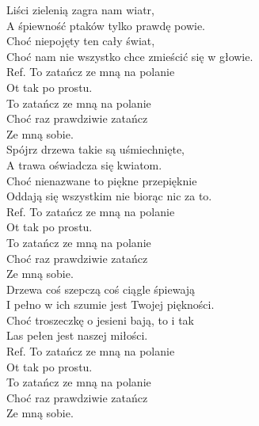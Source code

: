 
\begin{flushleft}
Liści zielenią zagra nam wiatr,  \tab{} \tab{} \\
A śpiewność ptaków tylko prawdę powie.  \tab{} \\
Choć niepojęty ten cały świat,  \tab{} \\
Choć nam nie wszystko chce zmieścić się w głowie.  \\
\vskip 3mm
Ref. To zatańcz ze mną na polanie  \\
\hspace{0.9cm}Ot tak po prostu.  \tab{} \\
\hspace{0.9cm}To zatańcz ze mną na polanie   \\
\hspace{0.9cm}Choć raz prawdziwie zatańcz   \\
\hspace{0.9cm}Ze mną sobie.  \tab{}  \\
\vskip 3mm
Spójrz drzewa takie są uśmiechnięte, \\
A trawa oświadcza się kwiatom. \\
Choć nienazwane to piękne przepięknie \\
Oddają się wszystkim nie biorąc nic za to. \\
\vskip 3mm
Ref. To zatańcz ze mną na polanie\\
\hspace{0.9cm}Ot tak po prostu. \\
\hspace{0.9cm}To zatańcz ze mną na polanie \\
\hspace{0.9cm}Choć raz prawdziwie zatańcz \\
\hspace{0.9cm}Ze mną sobie. \\
\vskip 3mm
Drzewa coś szepczą coś ciągle śpiewają \\
I pełno w ich szumie jest Twojej piękności. \\
Choć troszeczkę o jesieni bają, to i tak \\
Las pełen jest naszej miłości.  \\
\vskip 3mm
Ref. To zatańcz ze mną na polanie\\
\hspace{0.9cm}Ot tak po prostu. \\
\hspace{0.9cm}To zatańcz ze mną na polanie \\
\hspace{0.9cm}Choć raz prawdziwie zatańcz \\
\hspace{0.9cm}Ze mną sobie. \\
\end{flushleft}
\clearpage

